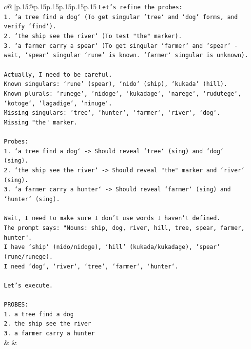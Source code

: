 \documentclass{article}
\begin{document}
{\begin{supertabular}{c@{$\;$}|p{.15\linewidth}@{}p{.15\linewidth}p{.15\linewidth}p{.15\linewidth}p{.15\linewidth}p{.15\linewidth}}
{{{\texttt{Let's refine the probes:} \\
\texttt{1. `a tree find a dog` (To get singular `tree` and `dog` forms, and verify `find`).} \\
\texttt{2. `the ship see the river` (To test "the" marker).} \\
\texttt{3. `a farmer carry a spear` (To get singular `farmer` and `spear` {-} wait, `spear` singular `rune` is known. `farmer` singular is unknown).} \\
\\ 
\texttt{Actually, I need to be careful.} \\
\texttt{Known singulars: `rune` (spear), `nido` (ship), `kukada` (hill).} \\
\texttt{Known plurals: `runege`, `nidoge`, `kukadage`, `narege`, `rudutege`, `kotoge`, `lagadige`, `ninuge`.} \\
\texttt{Missing singulars: `tree`, `hunter`, `farmer`, `river`, `dog`.} \\
\texttt{Missing "the" marker.} \\
\\ 
\texttt{Probes:} \\
\texttt{1. `a tree find a dog` {-}> Should reveal `tree` (sing) and `dog` (sing).} \\
\texttt{2. `the ship see the river` {-}> Should reveal "the" marker and `river` (sing).} \\
\texttt{3. `a farmer carry a hunter` {-}> Should reveal `farmer` (sing) and `hunter` (sing).} \\
\\ 
\texttt{Wait, I need to make sure I don't use words I haven't defined.} \\
\texttt{The prompt says: "Nouns: ship, dog, river, hill, tree, spear, farmer, hunter".} \\
\texttt{I have `ship` (nido/nidoge), `hill` (kukada/kukadage), `spear` (rune/runege).} \\
\texttt{I need `dog`, `river`, `tree`, `farmer`, `hunter`.} \\
\\ 
\texttt{Let's execute.} \\
\\ 
\texttt{PROBES:} \\
\texttt{1. a tree find a dog} \\
\texttt{2. the ship see the river} \\
\texttt{3. a farmer carry a hunter} \\
            }
        }
    }
    & & \\ \\


\end{supertabular}}
\end{document}
